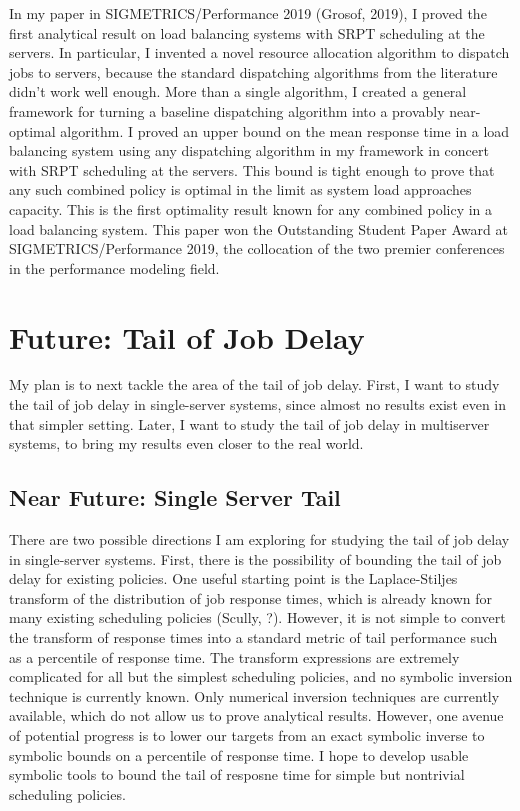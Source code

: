\documentclass[12pt]{article}
\begin{document}
In my paper in SIGMETRICS/Performance 2019 (Grosof, 2019),
I proved the first analytical result on load balancing systems with SRPT scheduling at the servers.
In particular, I invented a novel resource allocation algorithm to dispatch jobs to servers,
because the standard dispatching algorithms from the literature didn’t work well enough.
More than a single algorithm,
I created a general framework for turning a baseline dispatching algorithm
into a provably near-optimal algorithm.
I proved an upper bound on the mean response time
in a load balancing system using any dispatching algorithm in my framework
in concert with SRPT scheduling at the servers.
This bound is tight enough to prove that any such combined policy
is optimal in the limit as system load approaches capacity.
This is the first optimality result known for any combined policy in a load balancing system.
This paper won the Outstanding Student Paper Award at SIGMETRICS/Performance 2019,
the collocation of the two premier conferences in the performance modeling field.

\section{Future: Tail of Job Delay}
My plan is to next tackle the area of the tail of job delay. First, I want to study the tail of job delay in single-server systems, since almost no results exist even in that simpler setting. Later, I want to study the tail of job delay in multiserver systems, to bring my results even closer to the real world.

\subsection{Near Future: Single Server Tail}
There are two possible directions I am exploring for studying the tail of job delay in single-server systems. First, there is the possibility of bounding the tail of job delay for existing policies. One useful starting point is the Laplace-Stiljes transform of the distribution of job response times, which is already known for many existing scheduling policies (Scully, ?). However, it is not simple to convert the transform of response times into a standard metric of tail performance such as a percentile of response time. The transform expressions are extremely complicated for all but the simplest scheduling policies, and no symbolic inversion technique is currently known. Only numerical inversion techniques are currently available, which do not allow us to prove analytical results. However, one avenue of potential progress is to lower our targets from an exact symbolic inverse to symbolic bounds on a percentile of response time. I hope to develop usable symbolic tools to bound the tail of resposne time for simple but nontrivial scheduling policies.
\end{document}
